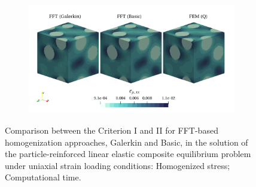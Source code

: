 \begin{figure}[hbt]
\begin{subfigure}[b]{0.49\textwidth}
    \caption{}
    \label{subfig:linear_3D_normal_cpu_time_vs_n_voxels}
  \end{subfigure}
  \begin{subfigure}[b]{\textwidth}
    \centering
    \includegraphics[width=\textwidth]{figures/linear_3D_normal_strain_11}
    \caption{}
    \label{subfig:linear_3D_normal_strain_11}
  \end{subfigure}
\caption{Comparison between the Criterion I and II for FFT-based homogenization approaches, Galerkin and Basic, in the
solution of the particle-reinforced linear elastic composite equilibrium problem under uniaxial
strain loading conditions:  Homogenized stress;  Computational time.}
\label{fig:linear_3D_normal_comparison_crit}
\end{figure}

